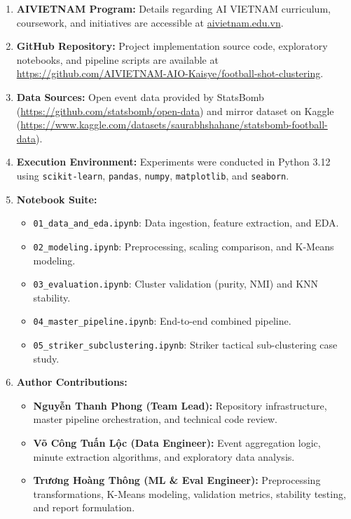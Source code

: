 \documentclass[12pt]{ai_conquer2026}
\begin{document}
\newpage
\begin{appendices}

\begin{enumerate}
  \item \textbf{AIVIETNAM Program:} Details regarding AI VIETNAM curriculum, coursework, and initiatives are accessible at \href{https://aivietnam.edu.vn/}{aivietnam.edu.vn}.
  \item \textbf{GitHub Repository:} Project implementation source code, exploratory notebooks, and pipeline scripts are available at \url{https://github.com/AIVIETNAM-AIO-Kaisye/football-shot-clustering}.
  \item \textbf{Data Sources:} Open event data provided by StatsBomb (\url{https://github.com/statsbomb/open-data}) and mirror dataset on Kaggle (\url{https://www.kaggle.com/datasets/saurabhshahane/statsbomb-football-data}).
  \item \textbf{Execution Environment:} Experiments were conducted in Python 3.12 using \texttt{scikit-learn}, \texttt{pandas}, \texttt{numpy}, \texttt{matplotlib}, and \texttt{seaborn}.
  \item \textbf{Notebook Suite:}
  \begin{itemize}
    \item \texttt{01\_data\_and\_eda.ipynb}: Data ingestion, feature extraction, and EDA.
    \item \texttt{02\_modeling.ipynb}: Preprocessing, scaling comparison, and K-Means modeling.
    \item \texttt{03\_evaluation.ipynb}: Cluster validation (purity, NMI) and KNN stability.
    \item \texttt{04\_master\_pipeline.ipynb}: End-to-end combined pipeline.
    \item \texttt{05\_striker\_subclustering.ipynb}: Striker tactical sub-clustering case study.
  \end{itemize}
  \item \textbf{Author Contributions:}
  \begin{itemize}
    \item \textbf{Nguyễn Thanh Phong (Team Lead):} Repository infrastructure, master pipeline orchestration, and technical code review.
    \item \textbf{Võ Công Tuấn Lộc (Data Engineer):} Event aggregation logic, minute extraction algorithms, and exploratory data analysis.
    \item \textbf{Trương Hoàng Thông (ML \& Eval Engineer):} Preprocessing transformations, K-Means modeling, validation metrics, stability testing, and report formulation.
  \end{itemize}
\end{enumerate}

\end{appendices}
\end{document}
